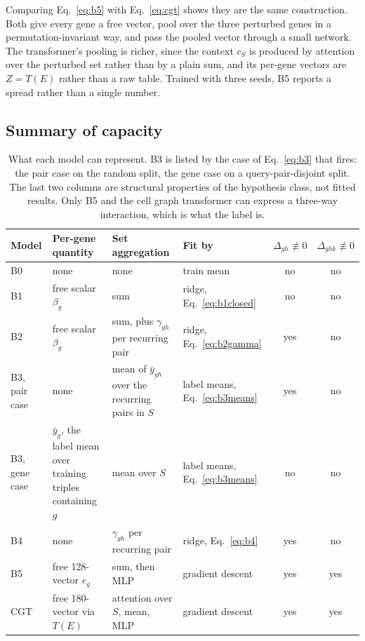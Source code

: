 Comparing Eq.~\ref{eq:b5} with Eq.~\ref{eq:cgt} shows they are the same
construction. Both give every gene a free vector, pool over the three perturbed
genes in a permutation-invariant way, and pass the pooled vector through a small
network. The transformer's pooling is richer, since the context $c_S$ is
produced by attention over the perturbed set rather than by a plain sum, and its
per-gene vectors are $Z = T(E)$ rather than a raw table. Trained with three
seeds, B5 reports a spread rather than a single number.

\subsection{Summary of capacity}

\begin{table}[htbp]
\centering
\footnotesize
\begin{tabular}{lp{}p{}lcc}
\hline
Model & Per-gene quantity & Set aggregation & Fit by & $\Delta_{gh} \not\equiv 0$ & $\Delta_{ghk} \not\equiv 0$ \\
\hline
B0 & none & none & train mean & no & no \\
B1 & free scalar $\beta_g$ & sum & ridge, Eq.~\ref{eq:b1closed} & no & no \\
B2 & free scalar $\beta_g$ & sum, plus $\gamma_{gh}$ per recurring pair & ridge, Eq.~\ref{eq:b2gamma} & yes & no \\
B3, pair case & none & mean of $\bar{y}_{gh}$ over the recurring pairs in $S$ & label means, Eq.~\ref{eq:b3means} & yes & no \\
B3, gene case & $\bar{y}_g$, the label mean over training triples containing $g$ & mean over $S$ & label means, Eq.~\ref{eq:b3means} & no & no \\
B4 & none & $\gamma_{gh}$ per recurring pair & ridge, Eq.~\ref{eq:b4} & yes & no \\
B5 & free 128-vector $e_g$ & sum, then MLP & gradient descent & yes & yes \\
CGT & free 180-vector via $T(E)$ & attention over $S$, mean, MLP & gradient descent & yes & yes \\
\hline
\end{tabular}
\caption{What each model can represent. B3 is listed by the case of
Eq.~\ref{eq:b3} that fires: the pair case on the random split, the gene case on
a query-pair-disjoint split. The last two columns are structural properties of
the hypothesis class, not fitted results. Only B5 and the cell graph transformer
can express a three-way interaction, which is what the label is.}
\label{tab:capacity}
\end{table}

